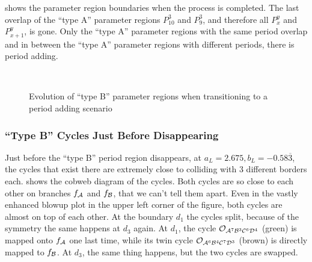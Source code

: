  shows the parameter region boundaries when the process is completed.
The last overlap of the ``type A'' parameter regions $P_{10}^3$ and $P_{9}^3$, and therefore all $P_x^y$ and $P_{x+1}^y$, is gone.
Only the ``type A'' parameter regions with the same period overlap and in between the ``type A'' parameter regions with different periods, there is period adding.



\begin{figure}
    \centering
     \\
    \caption{Evolution of ``type B'' parameter regions when transitioning to a period adding scenario}
    \label{fig:minrep.path.to.disappearance}
\end{figure}

\subsubsection{``Type B'' Cycles Just Before Disappearing}

Just before the ``type B'' period region disappears, at $a_L = 2.675, b_L = -0.58\overline{3}$, the cycles that exist there are extremely close to colliding with 3 different borders each.
 shows the cobweb diagram of the cycles.
Both cycles are so close to each other on branches $f_{\mathcal{A}}$ and $f_{\mathcal{B}}$, that we can't tell them apart.
Even in the vastly enhanced blowup plot in the upper left corner of the figure, both cycles are almost on top of each other.
At the boundary $d_1$ the cycles split, because of the symmetry the same happens at $d_3$ again.
At $d_1$, the cycle $\mathcal{O}_{\mathcal{A}^7\mathcal{B}^3\mathcal{C}^6\mathcal{D}^4}$ (green) is mapped onto $f_{\mathcal{A}}$ one last time, while its twin cycle $\mathcal{O}_{\mathcal{A}^6\mathcal{B}^4\mathcal{C}^7\mathcal{D}^3}$ (brown) is directly mapped to $f_{\mathcal{B}}$.
At $d_3$, the same thing happens, but the two cycles are swapped.


